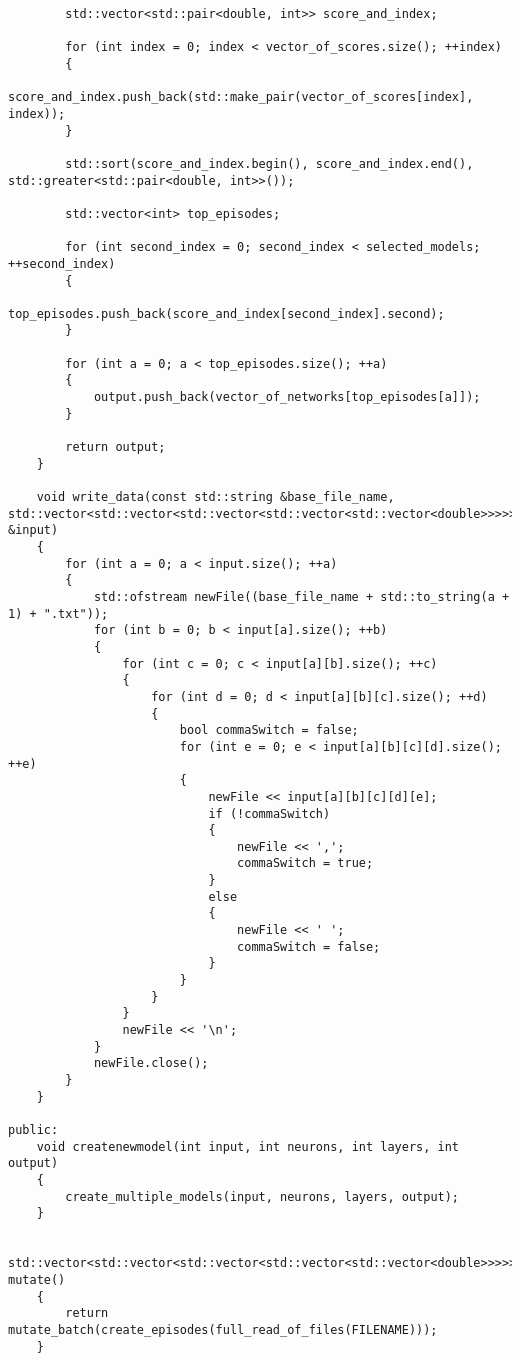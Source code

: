 \begin{verbatim}
        std::vector<std::pair<double, int>> score_and_index;

        for (int index = 0; index < vector_of_scores.size(); ++index)
        {
            score_and_index.push_back(std::make_pair(vector_of_scores[index], index));
        }

        std::sort(score_and_index.begin(), score_and_index.end(), std::greater<std::pair<double, int>>());

        std::vector<int> top_episodes;

        for (int second_index = 0; second_index < selected_models; ++second_index)
        {
            top_episodes.push_back(score_and_index[second_index].second);
        }

        for (int a = 0; a < top_episodes.size(); ++a)
        {
            output.push_back(vector_of_networks[top_episodes[a]]);
        }

        return output;
    }

    void write_data(const std::string &base_file_name, std::vector<std::vector<std::vector<std::vector<std::vector<double>>>>> &input)
    {
        for (int a = 0; a < input.size(); ++a)
        {
            std::ofstream newFile((base_file_name + std::to_string(a + 1) + ".txt"));
            for (int b = 0; b < input[a].size(); ++b)
            {
                for (int c = 0; c < input[a][b].size(); ++c)
                {
                    for (int d = 0; d < input[a][b][c].size(); ++d)
                    {
                        bool commaSwitch = false;
                        for (int e = 0; e < input[a][b][c][d].size(); ++e)
                        {
                            newFile << input[a][b][c][d][e];
                            if (!commaSwitch)
                            {
                                newFile << ',';
                                commaSwitch = true;
                            }
                            else
                            {
                                newFile << ' ';
                                commaSwitch = false;
                            }
                        }
                    }
                }
                newFile << '\n';
            }
            newFile.close();
        }
    }

public:
    void createnewmodel(int input, int neurons, int layers, int output)
    {
        create_multiple_models(input, neurons, layers, output);
    }

    std::vector<std::vector<std::vector<std::vector<std::vector<double>>>>> mutate()
    {
        return mutate_batch(create_episodes(full_read_of_files(FILENAME)));
    }


\end{verbatim}
